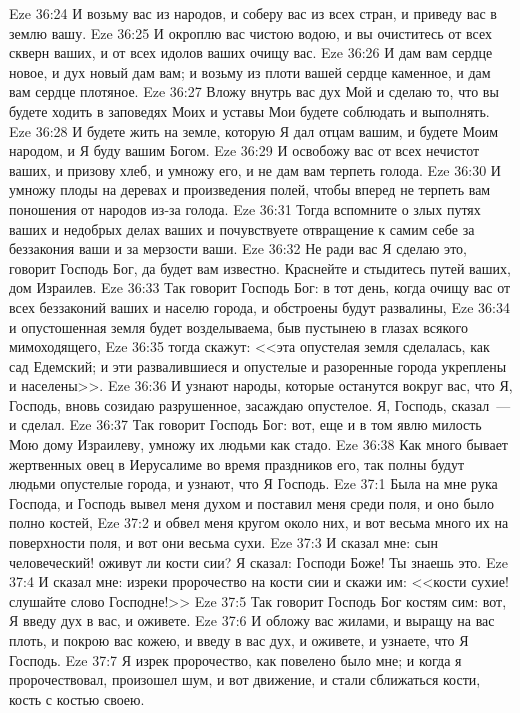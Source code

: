 \vs Eze 36:24 И возьму вас из народов, и соберу вас из всех стран, и приведу вас в землю вашу.
\vs Eze 36:25 И окроплю вас чистою водою, и вы очиститесь от всех скверн ваших, и от всех идолов ваших очищу вас.
\vs Eze 36:26 И дам вам сердце новое, и дух новый дам вам; и возьму из плоти вашей сердце каменное, и дам вам сердце плотяное.
\vs Eze 36:27 Вложу внутрь вас дух Мой и сделаю то, что вы будете ходить в заповедях Моих и уставы Мои будете соблюдать и выполнять.
\vs Eze 36:28 И будете жить на земле, которую Я дал отцам вашим, и будете Моим народом, и Я буду вашим Богом.
\vs Eze 36:29 И освобожу вас от всех нечистот ваших, и призову хлеб, и умножу его, и не дам вам терпеть голода.
\vs Eze 36:30 И умножу плоды на деревах и произведения полей, чтобы вперед не терпеть вам поношения от народов из-за голода.
\vs Eze 36:31 Тогда вспомните о злых путях ваших и недобрых делах ваших и почувствуете отвращение к самим себе за беззакония ваши и за мерзости ваши.
\vs Eze 36:32 Не ради вас Я сделаю это, говорит Господь Бог, да будет вам известно. Краснейте и стыдитесь путей ваших, дом Израилев.
\vs Eze 36:33 Так говорит Господь Бог: в тот день, когда очищу вас от всех беззаконий ваших и населю города, и обстроены будут развалины,
\vs Eze 36:34 и опустошенная земля будет возделываема, быв пустынею в глазах всякого мимоходящего,
\vs Eze 36:35 тогда скажут: <<эта опустелая земля сделалась, как сад Едемский; и эти развалившиеся и опустелые и разоренные города укреплены и населены>>.
\vs Eze 36:36 И узнают народы, которые останутся вокруг вас, что Я, Господь, вновь созидаю разрушенное, засаждаю опустелое. Я, Господь, сказал~--- и сделал.
\vs Eze 36:37 Так говорит Господь Бог: вот, еще и в том явлю милость Мою дому Израилеву, умножу их людьми как стадо.
\vs Eze 36:38 Как много бывает жертвенных овец в Иерусалиме во время праздников его, так полны будут людьми опустелые города, и узнают, что Я Господь.
\vs Eze 37:1 Была на мне рука Господа, и Господь вывел меня духом и поставил меня среди поля, и оно было полно костей,
\vs Eze 37:2 и обвел меня кругом около них, и вот весьма много их на поверхности поля, и вот они весьма сухи.
\vs Eze 37:3 И сказал мне: сын человеческий! оживут ли кости сии? Я сказал: Господи Боже! Ты знаешь это.
\vs Eze 37:4 И сказал мне: изреки пророчество на кости сии и скажи им: <<кости сухие! слушайте слово Господне!>>
\vs Eze 37:5 Так говорит Господь Бог костям сим: вот, Я введу дух в вас, и оживете.
\vs Eze 37:6 И обложу вас жилами, и выращу на вас плоть, и покрою вас кожею, и введу в вас дух, и оживете, и узнаете, что Я Господь.
\vs Eze 37:7 Я изрек пророчество, как повелено было мне; и когда я пророчествовал, произошел шум, и вот движение, и стали сближаться кости, кость с костью своею.
